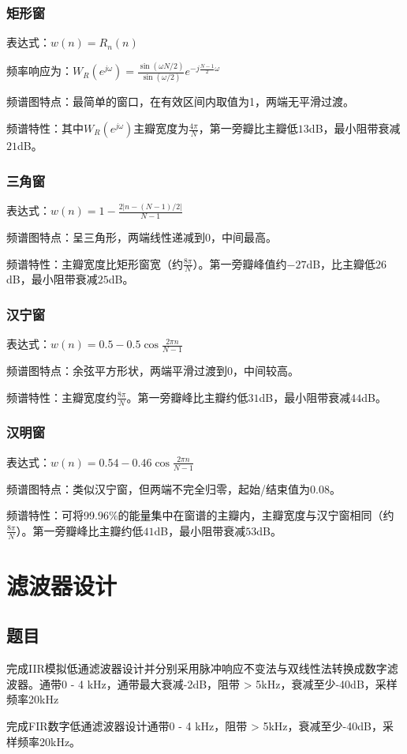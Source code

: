 \documentclass{ctexart}
\begin{document}
			\subsubsection{矩形窗}
				表达式：$w(n)=R_n(n)$\par
				频率响应为：$W_R(e^{j\omega})=\frac{\sin(\omega N/2)}{\sin(\omega /2)}e^{-j \frac{N-1}{2}\omega}$\par
				频谱图特点：最简单的窗口，在有效区间内取值为1，两端无平滑过渡。\par
				频谱特性：其中$W_R (e^{j\omega})$主瓣宽度为$\frac{4\pi}{N}$，第一旁瓣比主瓣低$13$dB，最小阻带衰减$21$dB。
			\subsubsection{三角窗}
				表达式：$w(n)=1-\frac{2\lvert n-(N-1)/2\rvert}{N-1}$\par
				频谱图特点：呈三角形，两端线性递减到$0$，中间最高。\par
				频谱特性：主瓣宽度比矩形窗宽（约$\frac{8\pi}{N}$）。第一旁瓣峰值约$-27$dB，比主瓣低$26$dB，最小阻带衰减$25$dB。
			\subsubsection{汉宁窗}
				表达式：$w(n)=0.5-0.5\cos⁡\frac{2\pi n}{N-1}$\par
				频谱图特点：余弦平方形状，两端平滑过渡到$0$，中间较高。\par
				频谱特性：主瓣宽度约$\frac{8\pi}{N}$。第一旁瓣峰比主瓣约低$31$dB，最小阻带衰减$44$dB。
			\subsubsection{汉明窗}
				表达式：$w(n)=0.54-0.46\cos⁡\frac{2\pi n}{N-1}$\par
				频谱图特点：类似汉宁窗，但两端不完全归零，起始/结束值为0.08。\par
				频谱特性：可将99.96\%的能量集中在窗谱的主瓣内，主瓣宽度与汉宁窗相同（约$\frac{8\pi}{N}$）。第一旁瓣峰比主瓣约低$41$dB，最小阻带衰减$53$dB。
			
	
	\newpage
	\section{滤波器设计}
		\subsection{题目}
			\begin{compactenum}
				\item 完成IIR模拟低通滤波器设计并分别采用脉冲响应不变法与双线性法转换成数字滤波器。通带0 - 4 kHz，通带最大衰减-2dB，阻带 > 5kHz，衰减至少-40dB，采样频率20kHz
				\item 完成FIR数字低通滤波器设计通带0 - 4 kHz，阻带 > 5kHz，衰减至少-40dB，采样频率20kHz。
			\end{compactenum}
\end{document}
